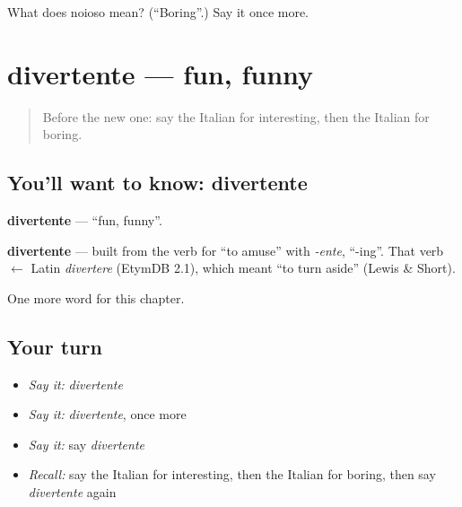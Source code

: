 \begin{tcolorbox}[breakable,colback=teal!4,colframe=teal!35!black,title={Before you move on}]
What does noioso mean? (\textquotedblleft{}Boring\textquotedblright{}.) Say it once more.
\end{tcolorbox}
\section[divertente]{divertente — fun, funny}

\label{lesson:IT-C126-divertente}



\begin{quote}
Before the new one: say the Italian for interesting, then the Italian for boring.
\end{quote}

\subsection*{You'll want to know: divertente}
\textbf{divertente} — \textquotedblleft{}fun, funny\textquotedblright{}.

\begin{cousinweb}
\textbf{divertente} — built from the verb for \textquotedblleft{}to amuse\textquotedblright{} with \emph{-ente}, \textquotedblleft{}-ing\textquotedblright{}. That verb $\leftarrow$ Latin \emph{divertere} (EtymDB 2.1), which meant \textquotedblleft{}to turn aside\textquotedblright{} (Lewis \& Short).
\end{cousinweb}

\begin{grammarlens}[title={What you've built}]
One more word for this chapter.
\end{grammarlens}

\subsection*{Your turn}
\begin{itemize}
\raggedright
  \item \emph{Say it:} \emph{divertente}
  \item \emph{Say it:} \emph{divertente}, once more
  \item \emph{Say it:} say \emph{divertente}
  \item \emph{Recall:} say the Italian for interesting, then the Italian for boring, then say \emph{divertente} again
\end{itemize}

